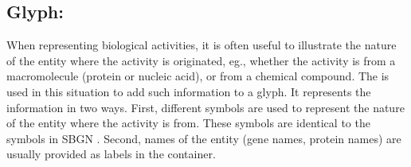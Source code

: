 \subsection{Glyph: }
\label{sec:af:unitInfo}

When representing biological activities, it is often useful to illustrate the nature of the entity where the activity is originated, eg., whether the activity is from a macromolecule (protein or nucleic acid), or from a chemical compound.  The \SBGNAFLone {} is used in this situation to add such information to a glyph.  It represents the information in two ways.  First, different symbols are used to represent the nature of the entity where the activity is from.  These symbols are identical to the  symbols in SBGN \PDl.  Second, names of the entity (gene names, protein names) are usually provided as labels in the  container.

